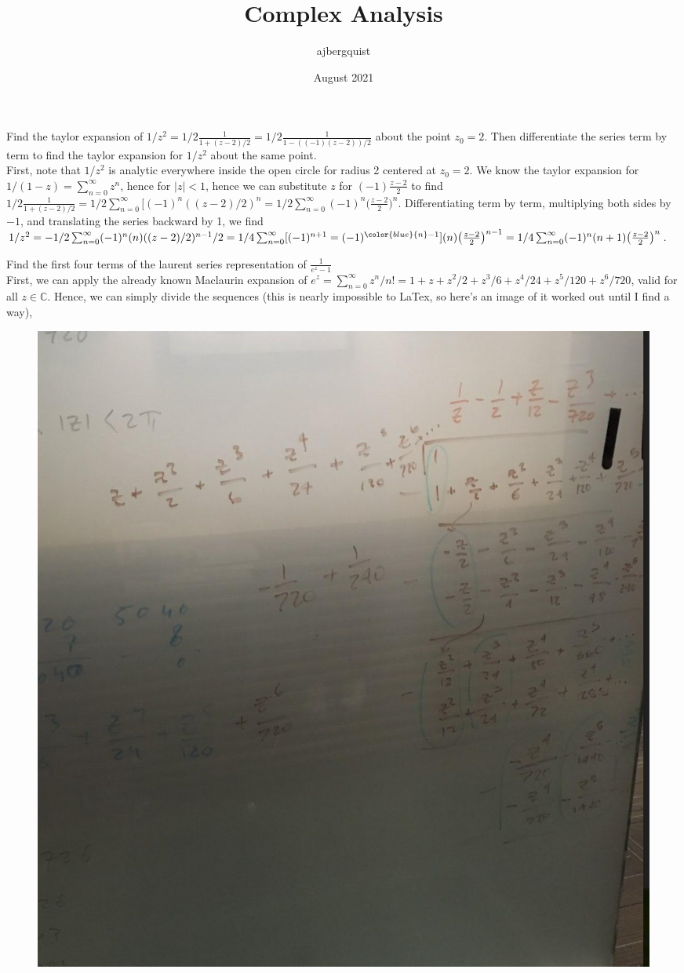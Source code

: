 \documentclass{article}
\title{Complex Analysis}
\author{ajbergquist }
\date{August 2021}
\theoremstyle{definition}
\newcommand{\C}{\mathbb{C}}
\newcommand{\infsum}{\sum_{n = 0}^{\infty}}
\newcommand{\cs}[1]{\color{blue}{#1}\normalcolor}
\begin{document}
 Find the taylor expansion of $1/z^2 = 1/2\frac{1}{1+(z-2)/2} = 1/2\frac{1}{1 - ((-1)(z-2))/2}$ about the point $z_0 = 2$. Then differentiate the series term by term to find the taylor expansion for $1/z^2$ about the same point.\\

 First, note that $1/z^2$ is analytic everywhere inside the open circle for radius 2 centered at $z_0 = 2$. We know the taylor expansion for $1/(1-z) = \infsum z^n$, hence for $|z| < 1$, hence we can substitute $z$ for $(-1)\frac{z-2}{2}$ to find $1/2\frac{1}{1+(z-2)/2} = 1/2\infsum[(-1)^n((z-2)/2)^n = 1/2\infsum (-1)^n\big(\frac{z-2}{2}\big)^n.$ Differentiating term by term, multiplying both sides by $-1$, and translating the series backward by 1, we find $1/z^2 = -1/2\infsum (-1)^n(n)((z-2)/2)^{n-1}/2 = 1/4\sum_{n = 0}^\infty[(-1)^{n+1}= (-1)^{\cs{n}-1}](n)\big(\frac{z-2}{2}\big)^{n-1} = 1/4\infsum(-1)^n(n+1)\big(\frac{z-2}{2}\big)^n$.\\

\cs{Sec 72: 5/5}

 Find the first four terms of the laurent series representation of $\frac{1}{e^z-1}$\\
 First, we can apply the already known Maclaurin expansion of $e^z = \infsum z^n/n! = 1+z + z^2/2 + z^3/6 + z^4/24 + z^5/120 + z^6/720$, valid for all $z\in \C$. Hence, we can simply divide the sequences (this is nearly impossible to LaTex, so here's an image of it worked out until I find a way),
\begin{figure}[htbp]
\centerline{\includegraphics[scale=0.5]{long_div1.png}}
\caption{}
\label{fig}
\end{figure} \cs{A better picture might be nice...}
\end{document}
